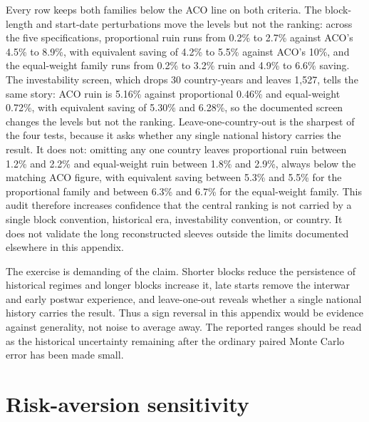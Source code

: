 \documentclass[11pt]{article}
\begin{document}
Every row keeps both families below the ACO line on both criteria. The
block-length and start-date perturbations move the levels but not the
ranking: across the five specifications, proportional ruin runs from 0.2\%
to 2.7\% against ACO's 4.5\% to 8.9\%, with equivalent saving of 4.2\% to
5.5\% against ACO's 10\%, and the equal-weight family runs from 0.2\% to
3.2\% ruin and 4.9\% to 6.6\% saving. The investability screen, which drops
30 country-years and leaves 1{,}527, tells the same story: ACO ruin is 5.16\%
against proportional 0.46\% and equal-weight 0.72\%, with equivalent saving
of 5.30\% and 6.28\%, so the documented screen changes the levels but not
the ranking. Leave-one-country-out is the sharpest of the four tests, because
it asks whether any single national history carries the result. It does not:
omitting any one country leaves proportional ruin between 1.2\% and 2.2\% and
equal-weight ruin between 1.8\% and 2.9\%, always below the matching ACO
figure, with equivalent saving between 5.3\% and 5.5\% for the proportional
family and between 6.3\% and 6.7\% for the equal-weight family. This audit
therefore increases confidence that the central ranking is not carried by a
single block convention, historical era, investability convention, or country.
It does not validate the long reconstructed sleeves outside the limits
documented elsewhere in this appendix.

The exercise is demanding of the claim. Shorter blocks reduce the persistence
of historical regimes and longer blocks increase it, late starts remove the
interwar and early postwar experience, and leave-one-out reveals whether a
single national history carries the result. Thus a sign reversal in this
appendix would be evidence against generality, not noise to average away. The
reported ranges should be read as the historical uncertainty remaining after
the ordinary paired Monte Carlo error has been made small.



\section{Risk-aversion sensitivity}
\label{app:gamma-sensitivity}
\end{document}
